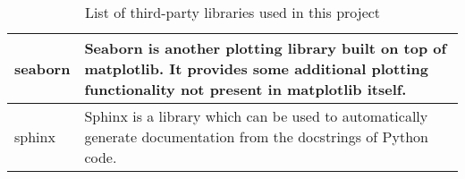 \begin{table}[H]
\begin{tabular}{l p{14cm}}
      seaborn & Seaborn is another plotting library built on top of matplotlib. It provides some additional plotting functionality not present in matplotlib itself.\\ \hline
       sphinx & Sphinx is a library which can be used to automatically generate documentation from the docstrings of Python code.\\
\bottomrule
\end{tabular}	
\caption{List of third-party libraries used in this project}
\end{table}
